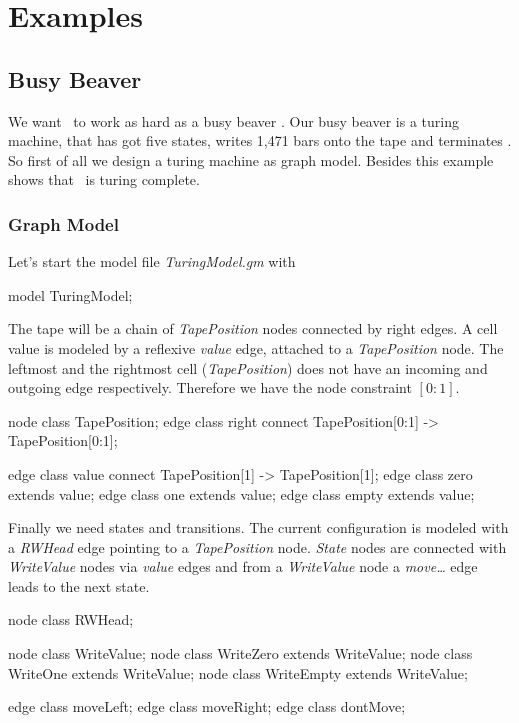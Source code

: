 \chapter{Examples}
\label{anexample}
\section{Busy Beaver}
We want \GrG\ to work as hard as a busy beaver \cite{kroll, bb}. Our busy beaver is a turing machine, that has got five states, writes 1,471 bars onto the tape and terminates \cite{beaver}. So first of all we design a turing machine as graph model. Besides this example shows that \GrG\ is turing complete. 

\subsection{Graph Model}
Let's start the model file \emph{TuringModel.gm} with
\begin{grgen}[firstnumber=1]
model TuringModel; 

\end{grgen}

The tape will be a chain of \emph{TapePosition} nodes connected by right edges. A cell value is modeled by a reflexive \emph{value} edge, attached to a \emph{TapePosition} node. The leftmost and the rightmost cell (\emph{TapePosition}) does not have an incoming and outgoing edge respectively. Therefore we have the node constraint $[0:1]$.
\begin{grgen}[firstnumber=last]
node class TapePosition; 
edge class right
  connect TapePosition[0:1] -> TapePosition[0:1];
  
edge class value
  connect TapePosition[1] -> TapePosition[1];  
edge class zero extends value;
edge class one extends value;
edge class empty extends value;

\end{grgen}
Finally we need states and transitions. The current configuration is modeled with a \emph{RWHead} edge pointing to a \emph{TapePosition} node. \emph{State} nodes are connected with \emph{WriteValue} nodes via \emph{value} edges and from a \emph{WriteValue} node a \emph{move\dots} edge leads to the next state.
\begin{grgen}[firstnumber=last]
node class RWHead;

node class WriteValue;
node class WriteZero extends WriteValue;
node class WriteOne extends WriteValue;
node class WriteEmpty extends WriteValue; 

edge class moveLeft;
edge class moveRight;
edge class dontMove;

\end{grgen}

